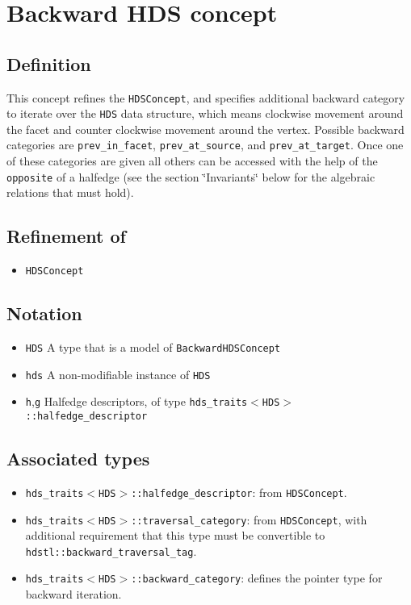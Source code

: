 \section{Backward HDS concept}\label{backwardhds}
\subsection{Definition}\label{backwardhds_refbackwardhds1}
This concept refines the {\tt HDSConcept}, and specifies additional backward category to iterate over the {\tt HDS} data structure, which means clockwise movement around the facet and counter clockwise movement around the vertex. Possible backward categories are {\tt prev\_\-in\_\-facet}, {\tt prev\_\-at\_\-source}, and {\tt prev\_\-at\_\-target}. Once one of these categories are given all others can be accessed with the help of the {\tt opposite} of a halfedge (see the section \char`\"{}Invariants\char`\"{} below for the algebraic relations that must hold).\subsection{Refinement of}\label{backwardhds_refbackwardhds2}
\begin{itemize}
\item {\tt HDSConcept}\end{itemize}
\subsection{Notation}\label{backwardhds_refbackwardhds3}
\begin{itemize}
\item {\tt HDS} A type that is a model of {\tt Backward\-HDSConcept}\item {\tt hds} A non-modifiable instance of {\tt HDS}\item {\tt h},{\tt g} Halfedge descriptors, of type {\tt hds\_\-traits$<$HDS$>$::halfedge\_\-descriptor}\end{itemize}
\subsection{Associated types}\label{backwardhds_refbackwardhds4}
\begin{itemize}
\item {\tt hds\_\-traits$<$HDS$>$::halfedge\_\-descriptor}: from {\tt HDSConcept}.\item {\tt hds\_\-traits$<$HDS$>$::traversal\_\-category}: from {\tt HDSConcept}, with additional requirement that this type must be convertible to {\tt hdstl::backward\_\-traversal\_\-tag}.\item {\tt hds\_\-traits$<$HDS$>$::backward\_\-category}: defines the pointer type for backward iteration.\end{itemize}
